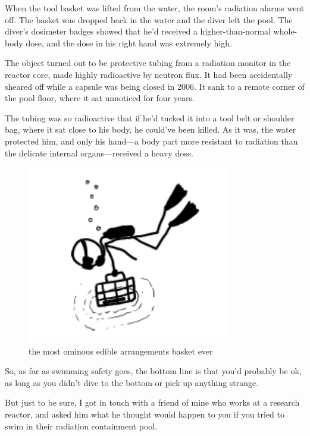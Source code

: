 {When the tool basket was lifted from the water, the room’s radiation alarms went off. The basket was dropped back in the water and the diver left the pool. The diver’s dosimeter badges showed that he’d received a higher-than-normal whole-body dose, and the dose in his right hand was extremely high.}

{The object turned out to be protective tubing from a radiation monitor in the reactor core, made highly radioactive by neutron flux. It had been accidentally sheared off while a capsule was being closed in 2006. It sank to a remote corner of the pool floor, where it sat unnoticed for four years.}

{The tubing was so radioactive that if he’d tucked it into a tool belt or shoulder bag, where it sat close to his body, he could’ve been killed. As it was, the water protected him, and only his hand—a body part more resistant to radiation than the delicate internal organs—received a heavy dose.}

\begin{figure}[!htbp]
\centering
\includegraphics[scale=0.5, max width=0.8\textwidth]{imgs/a/29/pool_diver.png}
\caption{the most ominous edible arrangements basket ever}
\end{figure}

{So, as far as swimming safety goes, the bottom line is that you’d probably be ok, as long as you didn’t dive to the bottom or pick up anything strange.}

{But just to be sure, I got in touch with a friend of mine who works at a research reactor, and asked him what he thought would happen to you if you tried to swim in their radiation containment pool.}

